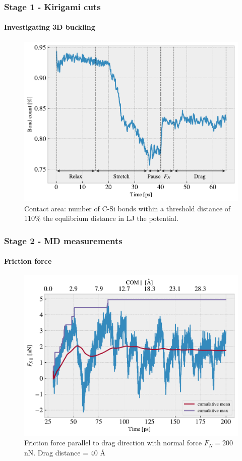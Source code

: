 \documentclass[
	10pt, %
]{beamer}
\begin{document}
\begin{frame}
	\frametitle{Stage 1 - Kirigami cuts}
	\framesubtitle{Investigating 3D buckling}


	\begin{figure}
		\includegraphics[width=0.7\linewidth]{figures/contact_pct.pdf}
		\caption{Contact area: number of C-Si bonds within a threshold distance of 110\% the equlibrium distance in LJ the potential.}
	\end{figure}	

	
\end{frame}



\begin{frame}
	\frametitle{Stage 2 - MD measurements}
	\framesubtitle{Friction force}

	
	\begin{figure}
		\includegraphics[width=0.7\linewidth]{figures/drag1.pdf}
		\caption{Friction force parallel to drag direction with normal force $F_N = 200$ nN. Drag distance = 40 Å}
	\end{figure}	
	
\end{frame}
\end{document}
